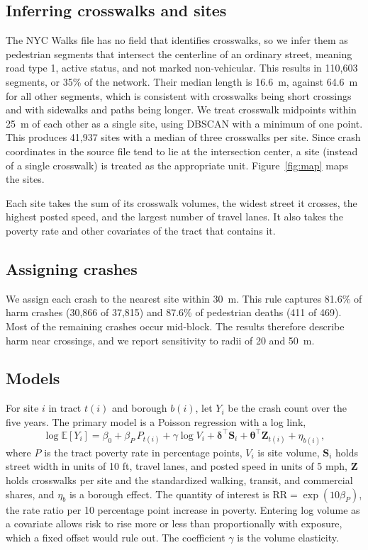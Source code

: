 \documentclass[10pt,twocolumn]{article}
\begin{document}
\subsection{Inferring crosswalks and sites}
The NYC Walks file has no field that identifies crosswalks, so we infer them as pedestrian segments that intersect the centerline of an ordinary street, meaning road type 1, active status, and not marked non-vehicular. This results in 110,603 segments, or 35\% of the network. Their median length is 16.6~m, against 64.6~m for all other segments, which is consistent with crosswalks being short crossings and with sidewalks and paths being longer. We treat crosswalk midpoints within 25~m of each other as a single site, using DBSCAN with a minimum of one point. This produces 41,937 sites with a median of three crosswalks per site. Since crash coordinates in the source file tend to lie at the intersection center, a site (instead of a single crosswalk) is treated as the appropriate unit. Figure~\ref{fig:map} maps the sites.

Each site takes the sum of its crosswalk volumes, the widest street it crosses, the highest posted speed, and the largest number of travel lanes. It also takes the poverty rate and other covariates of the tract that contains it.

\subsection{Assigning crashes}
We assign each crash to the nearest site within 30~m. This rule captures 81.6\% of harm crashes (30,866 of 37,815) and 87.6\% of pedestrian deaths (411 of 469). Most of the remaining crashes occur mid-block. The results therefore describe harm near crossings, and we report sensitivity to radii of 20 and 50~m.

\subsection{Models}
For site $i$ in tract $t(i)$ and borough $b(i)$, let $Y_i$ be the crash count over the five years. The primary model is a Poisson regression with a log link,
\begin{equation}
\log \mathbb{E}[Y_i] = \beta_0 + \beta_P \, P_{t(i)} + \gamma \log V_i + \boldsymbol{\delta}^{\top} \mathbf{S}_i + \boldsymbol{\theta}^{\top} \mathbf{Z}_{t(i)} + \eta_{b(i)},
\label{eq:model}
\end{equation}
where $P$ is the tract poverty rate in percentage points, $V_i$ is site volume, $\mathbf{S}_i$ holds street width in units of 10 ft, travel lanes, and posted speed in units of 5 mph, $\mathbf{Z}$ holds crosswalks per site and the standardized walking, transit, and commercial shares, and $\eta_b$ is a borough effect. The quantity of interest is $\mathrm{RR}=\exp(10\beta_P)$, the rate ratio per 10 percentage point increase in poverty. Entering log volume as a covariate allows risk to rise more or less than proportionally with exposure, which a fixed offset would rule out. The coefficient $\gamma$ is the volume elasticity.
\end{document}
